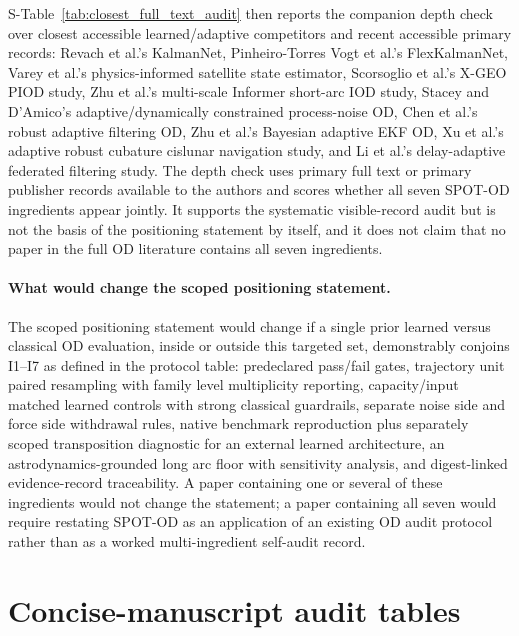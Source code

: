 \documentclass{article}
\begin{document}
S-Table~\ref{tab:closest_full_text_audit} then reports the companion depth check over closest accessible learned/adaptive competitors and recent accessible primary records: Revach et al.'s KalmanNet, Pinheiro-Torres Vogt et al.'s FlexKalmanNet, Varey et al.'s physics-informed satellite state estimator, Scorsoglio et al.'s X-GEO PIOD study, Zhu et al.'s multi-scale Informer short-arc IOD study, Stacey and D'Amico's adaptive/dynamically constrained process-noise OD, Chen et al.'s robust adaptive filtering OD, Zhu et al.'s Bayesian adaptive EKF OD, Xu et al.'s adaptive robust cubature cislunar navigation study, and Li et al.'s delay-adaptive federated filtering study. The depth check uses primary full text or primary publisher records available to the authors and scores whether all seven SPOT-OD ingredients appear jointly. It supports the systematic visible-record audit but is not the basis of the positioning statement by itself, and it does not claim that no paper in the full OD literature contains all seven ingredients.

\paragraph{What would change the scoped positioning statement.}
The scoped positioning statement would change if a single prior learned versus classical OD evaluation, inside or outside this targeted set, demonstrably conjoins I1--I7 as defined in the protocol table: predeclared pass/fail gates, trajectory unit paired resampling with family level multiplicity reporting, capacity/input matched learned controls with strong classical guardrails, separate noise side and force side withdrawal rules, native benchmark reproduction plus separately scoped transposition diagnostic for an external learned architecture, an astrodynamics-grounded long arc floor with sensitivity analysis, and digest-linked evidence-record traceability. A paper containing one or several of these ingredients would not change the statement; a paper containing all seven would require restating SPOT-OD as an application of an existing OD audit protocol rather than as a worked multi-ingredient self-audit record.


\section{Concise-manuscript audit tables}
\label{app:concise-manuscript-audit-tables}
\end{document}
